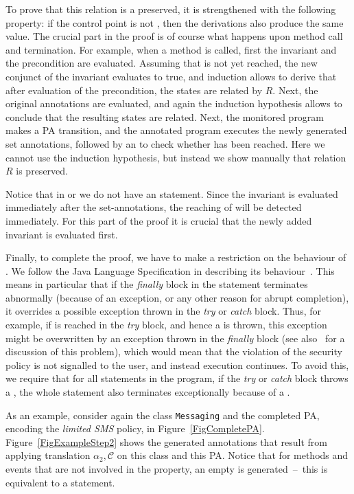 To prove that this relation is a preserved, it is
strengthened with the following property: if the control point is not
\halted, then the derivations also produce the same value. The crucial
part in the proof is of course what happens upon method call and
termination. For example, when a method is called, first the invariant
and the precondition are evaluated. Assuming that \halted is not yet
reached, the new conjunct of the invariant evaluates to true, and
induction allows to derive that after evaluation of the precondition,
the states are related by \(R\). Next, the original \preset
annotations are evaluated, and again the induction hypothesis allows
to conclude that the resulting states are related. Next, the monitored
program makes a PA transition, and the annotated program executes the
newly generated set annotations, followed by an \Assert to check
whether
\halted has been reached. Here we cannot use the induction hypothesis,
but instead we show manually that relation \(R\) is preserved.

Notice that in \postset or \excset we do not have an \Assert
statement. Since the invariant is evaluated immediately after the
set-annotations, the reaching of \halted will be detected
immediately. For this part of the proof it is crucial that
the newly added invariant is evaluated first.

Finally,  to complete the proof, we have to make a
restriction on the behaviour of \TryCatch. We follow the Java Language
Specification in describing its behaviour~\cite{GoslingJSB05}. This
means in particular that if the \emph{finally} block in the statement
terminates abnormally (because of an exception, or any other reason
for abrupt completion), it overrides a possible exception thrown in
the \emph{try} or \emph{catch} block. Thus, for example, if \halted
is reached in the \emph{try} block, and hence a \JMLExc is thrown, this
exception might be overwritten by an exception thrown in the
\emph{finally} block (see also~\cite{Huisman08} for a discussion of
this problem), which would mean that the violation of the security
policy is not signalled to the user, and instead execution
continues. To avoid this, we require that for all \TryCatch statements
in the program, if the \emph{try} or
\emph{catch} block throws a \JMLExc, the whole statement
also terminates exceptionally because of a \JMLExc.


As an example, consider again
the class \texttt{Messaging} and the completed
PA, encoding the \emph{limited SMS} policy, in
Figure~\ref{FigCompletePA}. Figure~\ref{FigExampleStep2} shows the
generated annotations that result from applying translation
\(\alpha_2,\mathcal{C}\) on this class and this PA. Notice that for methods
and events that are not involved in the property, an empty \CaseJML is
generated~--~this is equivalent to a
\Skip statement.

